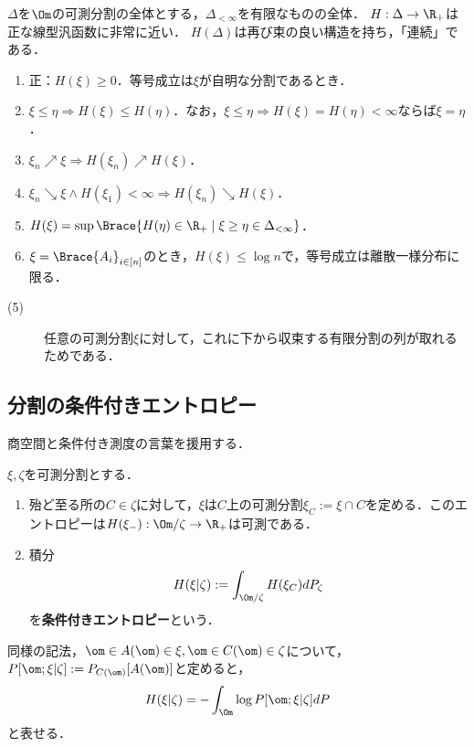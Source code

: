\documentclass[uplatex,dvipdfmx]{jsreport}
\begin{document}
\begin{proposition}
    $\Delta$を$\Om$の可測分割の全体とする，$\Delta_{<\infty}$を有限なものの全体．
    $H:\Delta\to\R_+$は正な線型汎函数に非常に近い．
    $H(\Delta)$は再び束の良い構造を持ち，「連続」である．
    \begin{enumerate}
        \item 正：$H(\xi)\ge0$．等号成立は$\xi$が自明な分割であるとき．
        \item $\xi\le\eta\Rightarrow H(\xi)\le H(\eta)$．なお，$\xi\le\eta\Rightarrow H(\xi)=H(\eta)<\infty$ならば$\xi=\eta$．
        \item $\xi_n\nearrow\xi\Rightarrow H(\xi_n)\nearrow H(\xi)$．
        \item $\xi_n\searrow\xi\land H(\xi_1)<\infty\Rightarrow H(\xi_n)\searrow H(\xi)$．
        \item $H(\xi)=\sup\Brace{H(\eta)\in\R_+\mid\xi\ge\eta\in\Delta_{<\infty}}$．
        \item $\xi=\Brace{A_i}_{i\in[n]}$のとき，$H(\xi)\le\log n$で，等号成立は離散一様分布に限る．
    \end{enumerate}
\end{proposition}
\begin{Proof}\mbox{}
    \begin{description}
        \item[(5)] 任意の可測分割$\xi$に対して，これに下から収束する有限分割の列が取れるためである．
    \end{description}
\end{Proof}

\subsection{分割の条件付きエントロピー}

\begin{tcolorbox}[colframe=ForestGreen, colback=ForestGreen!10!white,breakable,colbacktitle=ForestGreen!40!white,coltitle=black,fonttitle=\bfseries\sffamily,
title=]
    商空間と条件付き測度の言葉を援用する．
\end{tcolorbox}

\begin{definition}
    $\xi,\zeta$を可測分割とする．
    \begin{enumerate}
        \item 殆ど至る所の$C\in\zeta$に対して，$\xi$は$C$上の可測分割$\xi_C:=\xi\cap C$を定める．このエントロピーは$H(\xi_-):\Om/\zeta\to\R_+$は可測である．
        \item 積分
        \[H(\xi|\zeta):=\int_{\Om/\zeta}H(\xi_C)dP_\zeta\]
        を\textbf{条件付きエントロピー}という．
    \end{enumerate}
\end{definition}
\begin{remarks}
    同様の記法，$\om\in A(\om)\in\xi,\om\in C(\om)\in\zeta$について，$P[\om;\xi|\zeta]:=P_{C(\om)}[A(\om)]$と定めると，
    \[H(\xi|\zeta)=-\int_\Om\log P[\om;\xi|\zeta]dP\]
    と表せる．
\end{remarks}
\end{document}
